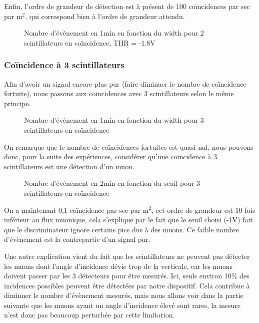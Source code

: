 \documentclass[a4paper,12pt,twoside]{article}
\begin{document}
Enfin, l’ordre de grandeur de détection est à présent de 100 coïncidences par sec par m$^2$, qui correspond bien à l’ordre de grandeur attendu.

\begin{figure}[h!]
    \centering
    \caption{Nombre d’évènement en 1min en fonction du width pour 2 scintillateurs en coïncidence, THR = -1.8V}
\end{figure}

\subsubsection{Coïncidence à 3 scintillateurs}
Afin d’avoir un signal encore plus pur (faire diminuer le nombre de coïncidence fortuite), nous passons aux coïncidences avec 3 scintillateurs selon le même principe.

\begin{figure}[h!]
    \centering
    \caption{Nombre d’évènement en 1min en fonction du width pour 3 scintillateurs en coïncidence}
\end{figure}

On remarque que le nombre de coïncidences fortuites est quasi-nul, nous pouvons donc, pour la suite des expériences, considérer qu’une coïncidence à 3 scintillateurs est une détection d’un muon.

\begin{figure}[h!]
    \centering
    \caption{Nombre d’évènement en 2min en fonction du seuil pour 3 scintillateurs en coïncidence}
\end{figure}

On a maintenant 0,1 coïncidence par sec par m$^2$, cet ordre de grandeur est 10 fois inférieur au flux muonique, cela s’explique par le fait que le seuil choisi (-1V) fait que le discriminateur ignore certains pics dus à des muons. Ce faible nombre d’évènement est la contrepartie d’un signal pur.

Une autre explication vient du fait que les scintillateurs ne peuvent pas détecter les muons dont l’angle d’incidence dévie trop de la verticale, car les muons doivent passer par les 3 détecteurs pour être mesurés. Ici, seuls environ 10\% des incidences possibles peuvent être détectées par notre dispositif. Cela contribue à diminuer le nombre d’évènement mesurés, mais nous allons voir dans la partie suivante que les muons ayant un angle d’incidence élevé sont rares, la mesure n’est donc pas beaucoup perturbée par cette limitation.
\end{document}
